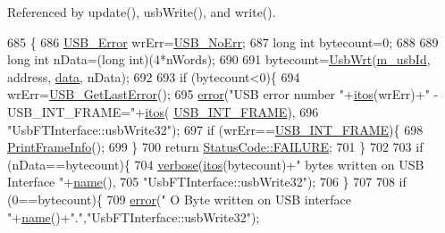 Referenced by update(), usb\+Write(), and write().


\begin{DoxyCode}
685                                                               \{
686   \hyperlink{LALUsbML_8h_aa7e5a2302774d5aa1d48a2a1cfc46e86}{USB\_Error} wrErr=\hyperlink{LALUsbML_8h_ab44759ae95dd86cbc2855adf525c43cd}{USB\_NoErr};
687   \textcolor{keywordtype}{long} \textcolor{keywordtype}{int}  bytecount=0;
688 
689   \textcolor{keywordtype}{long} \textcolor{keywordtype}{int} nData=(\textcolor{keywordtype}{long} int)(4*nWords);
690 
691   bytecount=\hyperlink{LALUsbML_8h_a417eaf04d96bd2d3fca0111f8003bcb0}{UsbWrt}(\hyperlink{classUsbFTInterface_a91df5c0547e8be460bc087e27afe05aa}{m\_usbId}, address, \hyperlink{namespaceshell_a5ea2525995cedc3efd69ea8a7f034d1e}{data}, nData);
692 
693   \textcolor{keywordflow}{if} (bytecount<0)\{
694     wrErr=\hyperlink{LALUsbML_8h_a1662b77c9968848acf173f6f9c765ddd}{USB\_GetLastError}();
695     \hyperlink{classObject_a204a95f57818c0f811933917a30eff45}{error}(\textcolor{stringliteral}{"USB error number "}+\hyperlink{Tools_8h_af330027dbdafb9a30768b3613c553e60}{itos}(wrErr)+\textcolor{stringliteral}{" - USB\_INT\_FRAME="}+\hyperlink{Tools_8h_af330027dbdafb9a30768b3613c553e60}{itos}(
      \hyperlink{LALUsbML_8h_a68260f9cf3649507d12904cfa1592c11afd1c409187b1dfd3d66887a5e07e7ed3}{USB\_INT\_FRAME}),
696             \textcolor{stringliteral}{"UsbFTInterface::usbWrite32"});
697     \textcolor{keywordflow}{if} (wrErr==\hyperlink{LALUsbML_8h_a68260f9cf3649507d12904cfa1592c11afd1c409187b1dfd3d66887a5e07e7ed3}{USB\_INT\_FRAME})\{
698       \hyperlink{LALUsbML_8h_ab3398c17204ba7fb4b47eb9bbf4ba94e}{PrintFrameInfo}();
699     \} 
700     \textcolor{keywordflow}{return} \hyperlink{classStatusCode_a6f565cbeadc76d14c72f047e5e85eb4ba3da73d4c469762eb9d3c960368252b26}{StatusCode::FAILURE};
701   \}
702 
703   \textcolor{keywordflow}{if} (nData==bytecount)\{
704     \hyperlink{classObject_a83d2db2df682907ea1115ad721c1c4a1}{verbose}(\hyperlink{Tools_8h_af330027dbdafb9a30768b3613c553e60}{itos}(bytecount)+\textcolor{stringliteral}{" bytes written on USB Interface "}+\hyperlink{classObject_a300f4c05dd468c7bb8b3c968868443c1}{name}(),
705             \textcolor{stringliteral}{"UsbFTInterface::usbWrite32"});
706   \}
707   
708   \textcolor{keywordflow}{if} (0==bytecount)\{
709     \hyperlink{classObject_a204a95f57818c0f811933917a30eff45}{error}(\textcolor{stringliteral}{" O Byte written on USB interface "}+\hyperlink{classObject_a300f4c05dd468c7bb8b3c968868443c1}{name}()+\textcolor{stringliteral}{"."},\textcolor{stringliteral}{"UsbFTInterface::usbWrite32"});

\end{DoxyCode}
